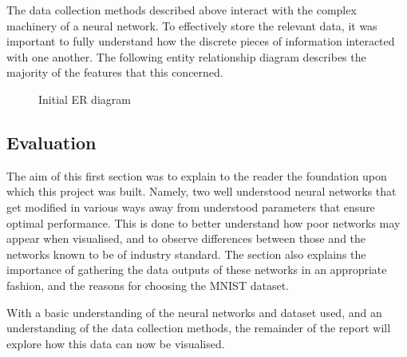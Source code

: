 \documentclass[a4paper,11pt,titlepage]{article}
\begin{document}
	The data collection methods described above interact with the complex machinery of a neural network. To effectively store the relevant data, it was important to fully understand how the discrete pieces of information interacted with one another. The following entity relationship diagram describes the majority of the features that this concerned.

	\begin{figure}[H]
    			\caption{Initial ER diagram}%
	\end{figure}	
	
\subsection{Evaluation}
The aim of this first section was to explain to the reader the foundation upon which this project was built. Namely, two well understood neural networks that get modified in various ways away from understood parameters that ensure optimal performance. This is done to better understand how poor networks may appear when visualised, and to observe differences between those and the networks known to be of industry standard. The section also explains the importance of gathering the data outputs of these networks in an appropriate fashion, and the reasons for choosing the MNIST dataset. 
	\par 
	With a basic understanding of the neural networks and dataset used, and an understanding of the data collection methods, the remainder of the report will explore how this data can now be visualised.

\clearpage
	
\end{document}
